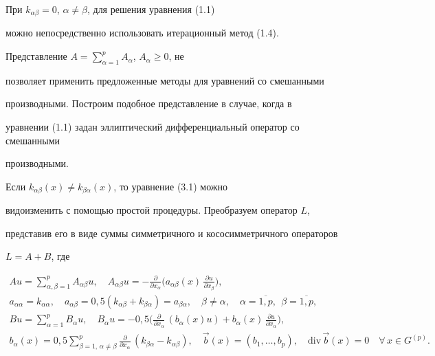 При $k_{\alpha\beta}=0$, $\alpha\ne\beta$, для решения уравнения (1.1)


можно непосредственно использовать итерационный метод (1.4).


Представление $A=\sum\limits_{\alpha=1}^pA_\alpha$, $A_\alpha\ge0$, не


позволяет применить предложенные методы для уравнений со смешанными


производными. Построим подобное представление в случае, когда в


уравнении (1.1) задан эллиптический дифференциальный оператор со смешанными


производными.





Если $k_{\alpha\beta}(x)\ne k_{\beta\alpha}(x)$, то уравнение (3.1) можно


видоизменить с помощью простой процедуры. Преобразуем оператор $L$,


представив его в виде суммы симметричного и кососимметричного операторов


$L=A+B$, где


\begin{gather*}


Au=\sum\limits_{\alpha,\beta=1}^pA_{\alpha\beta}u, \quad 


A_{\alpha\beta}u=-\frac{\partial}{\partial x_\alpha}


\bigg(a_{\alpha\beta}(x)\,\frac{\partial u}{\partial x_\beta}\bigg), \\


%


a_{\alpha\alpha}=k_{\alpha\alpha}, \quad


a_{\alpha\beta}=0{,}5(k_{\alpha\beta}+k_{\beta\alpha})=a_{\beta\alpha},


\quad \beta\neq\alpha,


\quad \alpha=\overline{1,p},\ \ \beta=\overline{1,p}, \\


%


Bu=\sum\limits_{\alpha=1}^pB_\alpha u, \quad 


B_\alpha u=-0{,}5\bigg(\frac{\partial}{\partial x_\alpha}


\,(b_\alpha(x)u)+b_\alpha(x)\,\frac{\partial u}{\partial x_\alpha}\bigg),\\


%


b_\alpha(x)=0{,}5\sum\limits_{\beta=1,\,\alpha\ne\beta}^p


\frac{\partial}{\partial x_\alpha}\,(k_{\beta\alpha}-k_{\alpha\beta}),


\quad \Vec b(x)=(b_1,\dotsc,b_p), \quad \mathrm{div}\,\Vec b(x)=0


\quad \forall\,x\in G^{(p)}.


\end{gather*}


